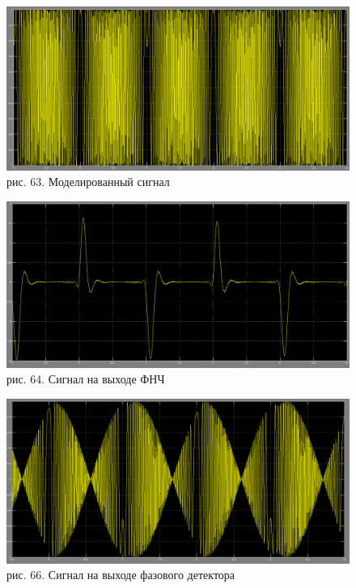 \documentclass[10pt,a4paper]{report}
\begin{document}
\begin{figure}
\begin{center}
\includegraphics[width=150mm, scale = 0.9]{8_14}\newline
рис. 63. Моделированный сигнал\newline
\end{center}
\end{figure}
\begin{figure}
\begin{center}
\includegraphics[width=150mm, scale = 0.9]{8_15}\newline
рис. 64. Сигнал на выходе ФНЧ\newline
\end{center}
\end{figure}
\begin{figure}
\begin{center}
\includegraphics[width=150mm, scale = 0.9]{8_16}\newline
рис. 66. Сигнал на выходе фазового детектора\newline
\end{center}
\end{figure}
\end{document}
